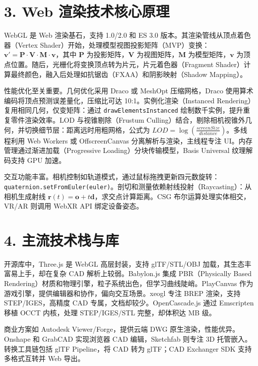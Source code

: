 \chapter{3. Web 渲染技术核心原理}
WebGL 是 Web 渲染基石，支持 1.0/2.0 和 ES 3.0 版本。其渲染管线从顶点着色器（Vertex Shader）开始，处理模型视图投影矩阵（MVP）变换：$\mathbf{v'} = \mathbf{P} \cdot \mathbf{V} \cdot \mathbf{M} \cdot \mathbf{v}$，其中 $\mathbf{P}$ 为投影矩阵，$\mathbf{V}$ 为视图矩阵，$\mathbf{M}$ 为模型矩阵，$\mathbf{v}$ 为顶点位置。随后，光栅化将变换顶点转为片元，片元着色器（Fragment Shader）计算最终颜色，融入后处理如抗锯齿（FXAA）和阴影映射（Shadow Mapping）。\par
性能优化至关重要。几何优化采用 Draco 或 MeshOpt 压缩网格，Draco 使用算术编码将顶点预测误差量化，压缩比可达 10:1。实例化渲染（Instanced Rendering）复用相同几何，仅变矩阵：通过 \texttt{drawElementsInstanced} 绘制数千实例，提升重复零件渲染效率。LOD 与视锥剔除（Frustum Culling）结合，剔除相机视锥外几何，并切换细节层：距离远时用粗网格，公式为 $LOD = \log(\frac{screenSize}{distance})$。多线程利用 Web Workers 或 OffscreenCanvas 分离解析与渲染，主线程专注 UI。内存管理通过渐进加载（Progressive Loading）分块传输模型，Basis Universal 纹理解码支持 GPU 加速。\par
交互功能丰富。相机控制如轨道模式，通过鼠标拖拽更新四元数旋转：\texttt{quaternion.setFromEuler(euler)}。剖切和测量依赖射线投射（Raycasting）：从相机生成射线 $\mathbf{r}(t) = \mathbf{o} + t \mathbf{d}$，求交点计算距离。CSG 布尔运算处理实体相交，VR/AR 则调用 WebXR API 绑定设备姿态。\par
\chapter{4. 主流技术栈与库}
开源库中，Three.js 是 WebGL 高层封装，支持 glTF/STL/OBJ 加载，其生态丰富易上手，却在复杂 CAD 解析上较弱。Babylon.js 集成 PBR（Physically Based Rendering）材质和物理引擎，粒子系统出色，但学习曲线陡峭。PlayCanvas 作为游戏引擎，提供编辑器和协作，偏向交互场景。xeogl 专注 BREP 渲染，支持 STEP/IGES，高精度 CAD 专属，文档却较少。OpenCascade.js 通过 Emscripten 移植 OCCT 内核，处理 STEP/IGES/STL 完整，却体积达 MB 级。\par
商业方案如 Autodesk Viewer/Forge，提供云端 DWG 原生渲染，性能优异。Onshape 和 GrabCAD 实现浏览器 CAD 编辑，Sketchfab 则专注 3D 托管嵌入。转换工具链包括 glTF Pipeline，将 CAD 转为 glTF；CAD Exchanger SDK 支持多格式互转并 Web 导出。\par
